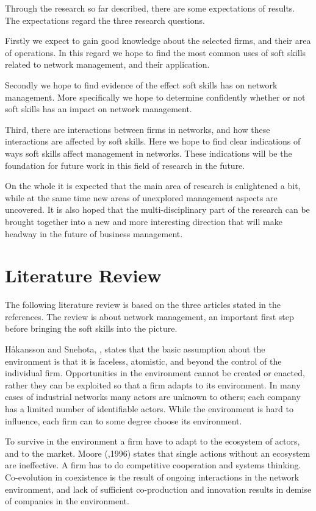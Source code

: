 \documentclass[12pt,journal,compsoc]{IEEEtran}
\begin{document}
Through the research so far described, there are some expectations of results.
The expectations regard the three research questions. 

Firstly we expect to gain good knowledge about the selected firms, and their
area of operations. In this regard we hope to find the most common uses of soft
skills related to network management, and their application. 

Secondly we hope to find evidence of the effect soft skills has on network
management. More specifically we hope to determine confidently whether or not
soft skills has an impact on network management. 

Third, there are interactions between firms in networks, and how these
interactions are affected by soft skills. Here we hope to find clear
indications of ways soft skills affect management in networks. These
indications will be the foundation for future work in this field of research in
the future. 

On the whole it is expected that the main area of research is enlightened a
bit, while at the same time new areas of unexplored management aspects are
uncovered. It is also hoped that the multi-disciplinary part of the research
can be brought together into a new and more interesting direction that will
make headway in the future of business management.  

\section{Literature Review}
The following literature review is based on the three articles stated in the
references. The review is about network management, an important first step
before bringing the soft skills into the picture. 
\vspace{.5cm}

Håkansson and Snehota, \cite{hakansson}, states that the basic assumption about the environment is that it is faceless, atomistic, and beyond the control of the individual firm. Opportunities in the environment cannot be created or enacted, rather they can be exploited so that a firm adapts to its environment. In many cases of industrial networks many actors are unknown to others; each company has a limited number of identifiable actors. While the environment is hard to influence, each firm can to some degree choose its environment.

To survive in the environment a firm have to adapt to the ecosystem of actors,
and to the market. Moore (\cite{moore},1996) states that single actions without an ecosystem are ineffective. A firm has to do competitive cooperation and systems thinking. Co-evolution in coexistence is the result of ongoing interactions in the network environment, and lack of sufficient co-production and innovation results in demise of companies in the environment.
\end{document}
